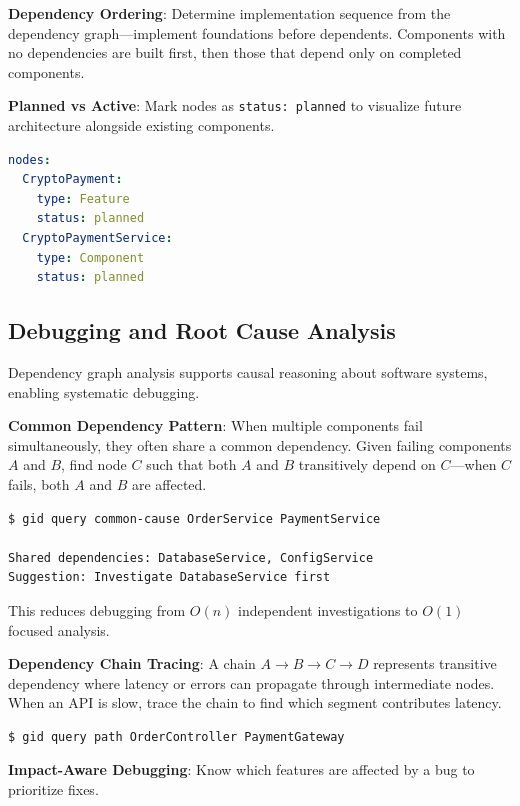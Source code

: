 \documentclass[11pt,a4paper]{article}
\begin{document}
\textbf{Dependency Ordering}: Determine implementation sequence from the dependency graph---implement foundations before dependents. Components with no dependencies are built first, then those that depend only on completed components.

\textbf{Planned vs Active}: Mark nodes as \texttt{status: planned} to visualize future architecture alongside existing components.

\begin{lstlisting}[language=yaml]
nodes:
  CryptoPayment:
    type: Feature
    status: planned
  CryptoPaymentService:
    type: Component
    status: planned
\end{lstlisting}

\subsection{Debugging and Root Cause Analysis}

Dependency graph analysis supports causal reasoning about software systems, enabling systematic debugging.

\textbf{Common Dependency Pattern}: When multiple components fail simultaneously, they often share a common dependency. Given failing components $A$ and $B$, find node $C$ such that both $A$ and $B$ transitively depend on $C$---when $C$ fails, both $A$ and $B$ are affected.

\begin{lstlisting}[language=bash]
$ gid query common-cause OrderService PaymentService

Shared dependencies: DatabaseService, ConfigService
Suggestion: Investigate DatabaseService first
\end{lstlisting}

This reduces debugging from $O(n)$ independent investigations to $O(1)$ focused analysis.

\textbf{Dependency Chain Tracing}: A chain $A \rightarrow B \rightarrow C \rightarrow D$ represents transitive dependency where latency or errors can propagate through intermediate nodes. When an API is slow, trace the chain to find which segment contributes latency.

\begin{lstlisting}[language=bash]
$ gid query path OrderController PaymentGateway
\end{lstlisting}

\textbf{Impact-Aware Debugging}: Know which features are affected by a bug to prioritize fixes.
\end{document}
